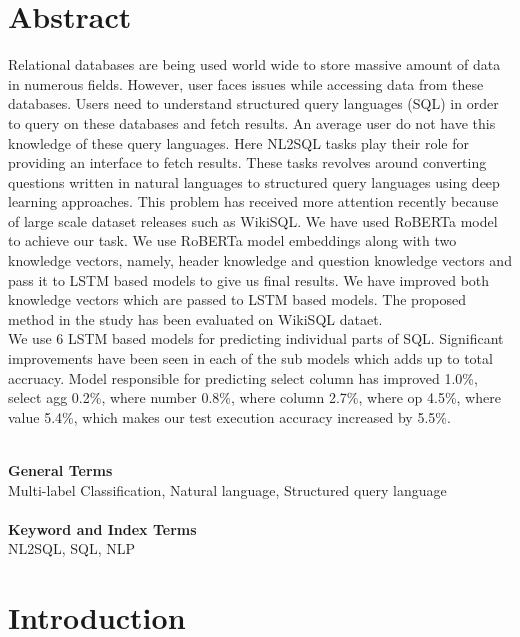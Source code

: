 \documentclass[12pt]{article}
\begin{document}
\section{Abstract}
Relational databases are being used world wide to store massive amount of data in numerous fields. However, user faces issues while accessing data from these databases. Users need to understand structured query languages (SQL) in order to query on these databases and fetch results. An average user do not have this knowledge of these query languages. Here NL2SQL tasks play their role for providing an interface to fetch results. These tasks revolves around converting questions written in natural languages to structured query languages using deep learning approaches. This problem has received more attention recently because of large scale dataset releases such as WikiSQL. We have used RoBERTa model to achieve our task. We use RoBERTa model embeddings along with two knowledge vectors, namely, header knowledge and question knowledge vectors and pass it to LSTM based models to give us final results. We have improved both knowledge vectors which are passed to LSTM based models. The proposed method in the study has been evaluated on WikiSQL dataet. 
\\
We use 6 LSTM based models for predicting individual parts of SQL. Significant improvements have been seen in each of the sub models which adds up to total accruacy. Model responsible for predicting select column has improved 1.0\%, select agg 0.2\%, where number 0.8\%, where column 2.7\%, where op 4.5\%, where value 5.4\%, which makes our test execution accuracy increased by 5.5\%.
\\
\\

\begin{flushleft}
\textbf{General Terms}
\\
Multi-label Classification, Natural language, Structured query language
\\
~\\
\textbf{Keyword and Index Terms}
\\
NL2SQL, SQL, NLP
\end{flushleft}



\newpage

\section{Introduction}
\end{document}
